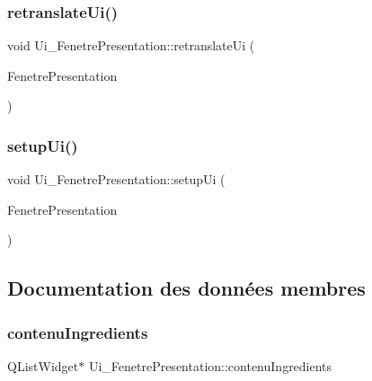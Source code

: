 \subsubsection{\texorpdfstring{retranslate\+Ui()}{retranslateUi()}}
{\footnotesize\ttfamily void Ui\+\_\+\+Fenetre\+Presentation\+::retranslate\+Ui (\begin{DoxyParamCaption}\item[{Q\+Widget $\ast$}]{Fenetre\+Presentation }\end{DoxyParamCaption})\hspace{0.3cm}{\ttfamily [inline]}}

\mbox{\label{class_ui___fenetre_presentation_a08e799fcf97f8afe980e76770b4ef960}} 
\subsubsection{\texorpdfstring{setup\+Ui()}{setupUi()}}
{\footnotesize\ttfamily void Ui\+\_\+\+Fenetre\+Presentation\+::setup\+Ui (\begin{DoxyParamCaption}\item[{Q\+Widget $\ast$}]{Fenetre\+Presentation }\end{DoxyParamCaption})\hspace{0.3cm}{\ttfamily [inline]}}



\subsection{Documentation des données membres}
\mbox{\label{class_ui___fenetre_presentation_a35b6dfdfa4899c487169582542e5b3e0}} 
\subsubsection{\texorpdfstring{contenu\+Ingredients}{contenuIngredients}}
{\footnotesize\ttfamily Q\+List\+Widget$\ast$ Ui\+\_\+\+Fenetre\+Presentation\+::contenu\+Ingredients}

